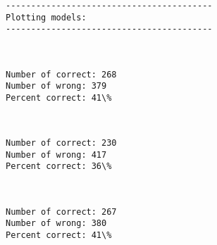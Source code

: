 \documentclass[11pt]{article}
\begin{document}
    \begin{Verbatim}[commandchars=\\\{\}]
-----------------------------------------
Plotting models:
-----------------------------------------

    \end{Verbatim}

    \begin{center}
    \end{center}
    { \hspace*{\fill} \\}
    
    \begin{Verbatim}[commandchars=\\\{\}]
Number of correct: 268
Number of wrong: 379
Percent correct: 41\%

    \end{Verbatim}

    \begin{center}
    \end{center}
    { \hspace*{\fill} \\}
    
    \begin{Verbatim}[commandchars=\\\{\}]
Number of correct: 230
Number of wrong: 417
Percent correct: 36\%

    \end{Verbatim}

    \begin{center}
    \end{center}
    { \hspace*{\fill} \\}
    
    \begin{Verbatim}[commandchars=\\\{\}]
Number of correct: 267
Number of wrong: 380
Percent correct: 41\%

    \end{Verbatim}

    \begin{center}
    \end{center}
    { \hspace*{\fill} \\}
    
\end{document}
